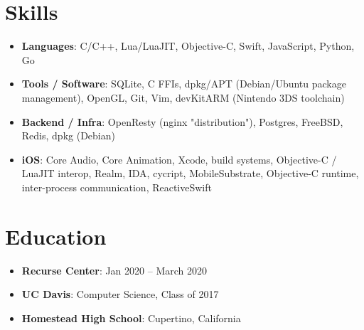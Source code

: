\documentclass[letterpaper,11pt]{article}
\newcommand{\resumeItem}[2]{
  \item\small{
    \textbf{#1}{: #2 \vspace{-2.5pt}}
  }
}
\newcommand{\resumeSubItem}[2]{\resumeItem{#1}{#2}\vspace{-4.5pt}}
\newcommand{\resumeSubHeadingListStart}{\begin{itemize}[leftmargin=*]}
\newcommand{\resumeSubHeadingListEnd}{\end{itemize}}
\begin{document}
  
\section{Skills}
  \resumeSubHeadingListStart
        \resumeSubItem{Languages}
            {C/C++, Lua/LuaJIT, Objective-C, Swift, JavaScript, Python, Go}
        \resumeSubItem{Tools / Software}
            {SQLite, C FFIs, dpkg/APT (Debian/Ubuntu package management), OpenGL, Git, Vim, devKitARM (Nintendo 3DS toolchain)}
        \resumeSubItem{Backend / Infra}
            {OpenResty (nginx "distribution"), Postgres, FreeBSD, Redis, dpkg (Debian)}
        \resumeSubItem{iOS}
            {Core Audio, Core Animation, Xcode, build systems, Objective-C / LuaJIT interop, Realm, IDA, cycript, MobileSubstrate, Objective-C runtime, inter-process communication, ReactiveSwift}
  \resumeSubHeadingListEnd


\section{Education}
  \resumeSubHeadingListStart
    \resumeSubItem
      {Recurse Center}{Jan 2020 -- March 2020}
    \resumeSubItem
      {UC Davis}{Computer Science, Class of 2017}
    \resumeSubItem
      {Homestead High School}{Cupertino, California}
  \resumeSubHeadingListEnd
\end{document}
